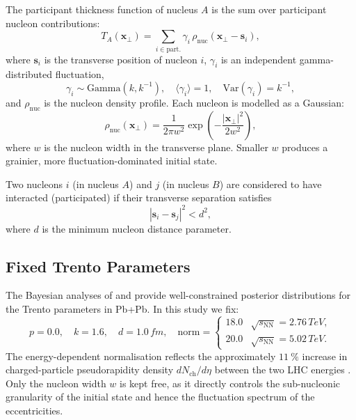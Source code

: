 \documentclass[12pt,a4paper,twoside]{report}
\newcommand{\mean}[1]{\langle #1 \rangle}
\newcommand{\sqrtsnn}{\sqrt{s_\mathrm{NN}}}
\newcommand{\dNdeta}{dN_\mathrm{ch}/d\eta}
\begin{document}
The participant thickness function of nucleus $A$ is the sum over
participant nucleon contributions:
\begin{equation}
  T_A(\bm{x}_\perp) = \sum_{i \in \mathrm{part.}}
    \gamma_i\, \rho_\mathrm{nuc}(\bm{x}_\perp - \bm{s}_i),
  \label{eq:TA}
\end{equation}
where $\bm{s}_i$ is the transverse position of nucleon $i$,
$\gamma_i$ is an independent gamma-distributed fluctuation,
\begin{equation}
  \gamma_i \sim \mathrm{Gamma}(k, k^{-1}),
  \quad \mean{\gamma_i} = 1,\quad \mathrm{Var}(\gamma_i) = k^{-1},
  \label{eq:gamma_fluctuation}
\end{equation}
and $\rho_\mathrm{nuc}$ is the nucleon density profile.  Each nucleon
is modelled as a Gaussian:
\begin{equation}
  \rho_\mathrm{nuc}(\bm{x}_\perp) = \frac{1}{2\pi w^2}
  \exp\!\left(-\frac{|\bm{x}_\perp|^2}{2w^2}\right),
  \label{eq:nucleon_profile}
\end{equation}
where $w$ is the nucleon width in the transverse plane.  Smaller $w$
produces a grainier, more fluctuation-dominated initial state.

Two nucleons $i$ (in nucleus $A$) and $j$ (in nucleus $B$) are
considered to have interacted (participated) if their transverse
separation satisfies
\begin{equation}
  |\bm{s}_i - \bm{s}_j|^2 < d^2,
  \label{eq:collision_criterion}
\end{equation}
where $d$ is the minimum nucleon distance parameter.

\subsection{Fixed Trento Parameters}
\label{subsec:fixed_trento}

The Bayesian analyses of \cite{Bernhard2019} and \cite{Nijs2021}
provide well-constrained posterior distributions for the Trento
parameters in Pb+Pb.  In this study we fix:
\begin{equation}
  p = 0.0, \quad k = 1.6, \quad d = 1.0\,\si{fm},
  \quad \mathrm{norm} =
  \begin{cases}
    18.0 & \sqrtsnn = 2.76\,\si{TeV}, \\
    20.0 & \sqrtsnn = 5.02\,\si{TeV}.
  \end{cases}
  \label{eq:fixed_trento}
\end{equation}
The energy-dependent normalisation reflects the approximately
$\SI{11}{\percent}$ increase in charged-particle pseudorapidity density
$\dNdeta$ between the two LHC energies
\cite{ALICE_2.76,ALICE_5.02}.
Only the nucleon width $w$ is kept free, as it directly controls the
sub-nucleonic granularity of the initial state and hence the
fluctuation spectrum of the eccentricities.
\end{document}
